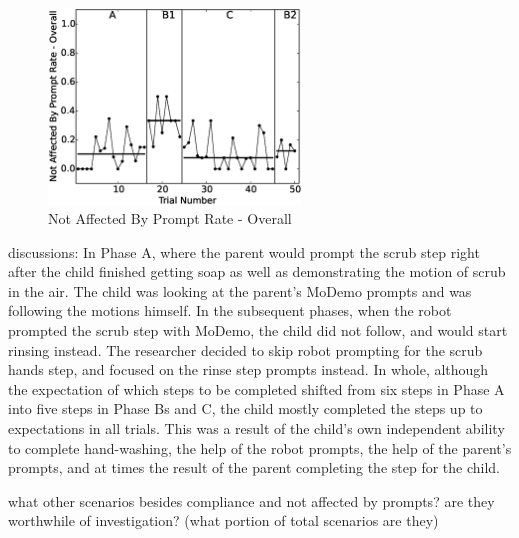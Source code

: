 \begin{figure} [h]
	\centering
	\includegraphics[width=0.6\textwidth]{./img/data_analysis/1NotAffectedByPromptRate-Overall.eps}
	\caption{Not Affected By Prompt Rate - Overall}
	\label{fig:1NotAffectedByPromptRate-Overall}
\end{figure}



discussions:
In Phase A, where the parent would prompt the scrub step right after the child finished getting soap as well as demonstrating the motion of scrub in the air.  The child was looking at the parent's MoDemo prompts and was following the motions himself.  In the subsequent phases, when the robot prompted the scrub step with MoDemo, the child did not follow, and would start rinsing instead.  The researcher decided to skip robot prompting for the scrub hands step, and focused on the rinse step prompts instead.  In whole, although the expectation of which steps to be completed shifted from six steps in Phase A into five steps in Phase Bs and C, the child mostly completed the steps up to expectations in all trials.  This was a result of the child's own independent ability to complete hand-washing, the help of the robot prompts, the help of the parent's prompts, and at times the result of the parent completing the step for the child.

what other scenarios besides compliance and not affected by prompts?  are they worthwhile of investigation? (what portion of total scenarios are they)




